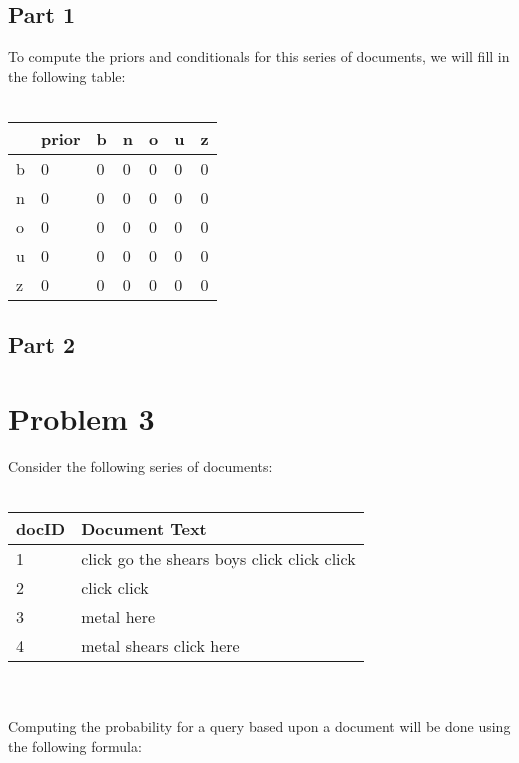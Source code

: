 \documentclass{article}%
\begin{document}
\subsection*{Part 1}
To compute the priors and conditionals for this series of documents, we will fill in the following table:\\
\\
\begin{tabular}{| l | l | l | l | l | l | l |}
    \hline
        & prior & b & n & o & u & z \\ \hline
    b   & 0     & 0 & 0 & 0 & 0 & 0 \\ \hline
    n   & 0     & 0 & 0 & 0 & 0 & 0 \\ \hline
    o   & 0     & 0 & 0 & 0 & 0 & 0 \\ \hline
    u   & 0     & 0 & 0 & 0 & 0 & 0 \\ \hline
    z   & 0     & 0 & 0 & 0 & 0 & 0 \\ \hline
\end{tabular}

\subsection*{Part 2}
\section*{Problem 3}
Consider the following series of documents:\\
\\
\begin{tabular}{l | l}
    docID & Document Text \\ \hline
    1 & click go the shears boys click click click \\ \hline
    2 & click click \\ \hline
    3 & metal here \\ \hline
    4 & metal shears click here \\ \hline
\end{tabular}\\
\vspace{5mm}\\
Computing the probability for a query based upon a document will be done using the following formula:
\end{document}
